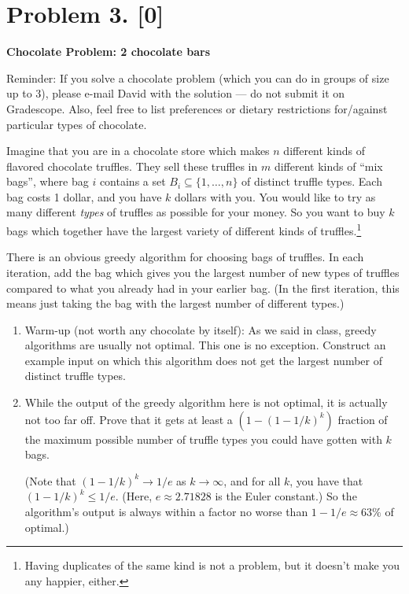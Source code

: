 \documentclass[10pt]{article}
\begin{document}
\section*{Problem 3. [0]}
\textbf{Chocolate Problem: 2 chocolate bars}

Reminder: If you solve a chocolate problem (which you can do in groups of size up to 3), please e-mail David with the solution --- do not submit it on Gradescope. Also, feel free to list preferences or dietary restrictions for/against particular types of chocolate.

Imagine that you are in a chocolate store which makes $n$ different kinds of flavored chocolate truffles. They sell these truffles in $m$ different kinds of ``mix bags'', where bag $i$ contains a set $B_i \subseteq \{1, \ldots, n\}$ of distinct truffle types. Each bag costs 1 dollar, and you have $k$ dollars with you. You would like to try as many different \emph{types} of truffles as possible for your money. So you want to buy $k$ bags which together have the largest variety of different kinds of truffles.\footnote{Having duplicates of the same kind is not a problem, but it doesn't make you any happier, either.}

There is an obvious greedy algorithm for choosing bags of truffles. In each iteration, add the bag which gives you the largest number of new types of truffles compared to what you already had in your earlier bag. (In the first iteration, this means just taking the bag with the largest number of different types.)

\begin{enumerate}
\item Warm-up (not worth any chocolate by itself): As we said in class, greedy algorithms are usually not optimal. This one is no exception. Construct an example input on which this algorithm does not get the largest number of distinct truffle types.
\item While the output of the greedy algorithm here is not optimal, it is actually not too far off. Prove that it gets at least a $(1-(1-1/k)^k)$ fraction of the maximum possible number of truffle types you could have gotten with $k$ bags.

  (Note that $(1-1/k)^k \to 1/e$ as $k \to \infty$, and for all $k$, you have that $(1-1/k)^k \leq 1/e$. (Here, $e \approx 2.71828$ is the Euler constant.) So the algorithm's output is always within a factor no worse than $1-1/e \approx 63\%$ of optimal.)
\end{enumerate}
\end{document}
